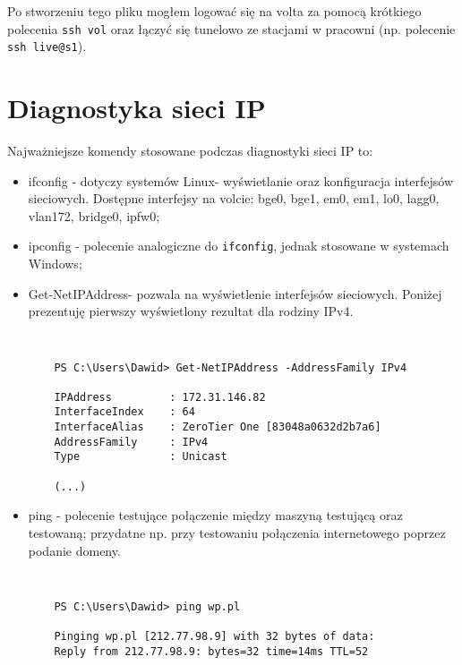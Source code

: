 \documentclass[a4paper,11pt]{article}
\begin{document}
Po stworzeniu tego pliku mogłem logować się na volta za pomocą krótkiego polecenia {\tt ssh vol} oraz łączyć się tunelowo ze stacjami w pracowni (np. polecenie {\tt ssh live@s1}).


\section{Diagnostyka sieci IP}

Najważniejsze komendy stosowane podczas diagnostyki sieci IP to:

\begin{itemize}
    \item ifconfig - dotyczy systemów Linux- wyświetlanie oraz konfiguracja interfejsów sieciowych. 
    Dostępne interfejsy na volcie: bge0, bge1, em0, em1, lo0, lagg0, vlan172, bridge0, ipfw0;
    
    \item ipconfig - polecenie analogiczne do {\tt ifconfig}, jednak stosowane w systemach Windows;
    
    \item Get-NetIPAddress- pozwala na wyświetlenie interfejsów sieciowych. Poniżej prezentuję pierwszy wyświetlony rezultat dla rodziny IPv4.
    
    {\tt
    \begin{verbatim}
    PS C:\Users\Dawid> Get-NetIPAddress -AddressFamily IPv4

    IPAddress         : 172.31.146.82
    InterfaceIndex    : 64
    InterfaceAlias    : ZeroTier One [83048a0632d2b7a6]
    AddressFamily     : IPv4
    Type              : Unicast
    
    (...)
    \end{verbatim}
    }
    
    \item ping - polecenie testujące połączenie między maszyną testującą oraz testowaną; przydatne np. przy testowaniu połączenia internetowego poprzez podanie domeny.
    
    {\tt
    \begin{verbatim}
    PS C:\Users\Dawid> ping wp.pl

    Pinging wp.pl [212.77.98.9] with 32 bytes of data:
    Reply from 212.77.98.9: bytes=32 time=14ms TTL=52
    \end{verbatim}
    }
    
\end{itemize}
\end{document}
